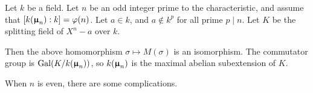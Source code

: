   \begin{thm}
    Let $k$ be a field. Let $n$ be an odd integer prime to the characteristic, and assume that $[k(\bm{\upmu}_n):k]=\varphi(n)$. Let $a\in k$, and $a\notin k^p$ for all prime $p\mid n$. Let $K$ be the splitting field of $X^n-a$ over $k$.
    
    Then the above homomorphism $\sigma\mapsto M(\sigma)$ is an isomorphism. The commutator group is $\operatorname{Gal}(K/k(\bm{\upmu}_n))$, so $k(\bm{\upmu}_n)$ is the maximal abelian subextension of $K$. 
  \end{thm}
  \begin{warn}
    When $n$ is even, there are some complications.
  \end{warn}